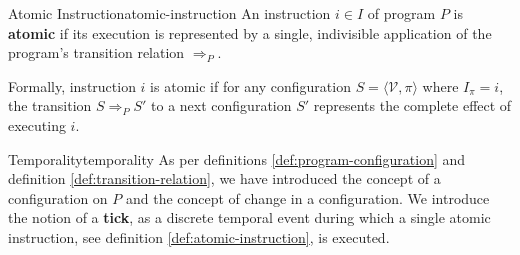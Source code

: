 \begin{definition}{Atomic Instruction}{atomic-instruction}
	An instruction $i \in I$ of program $P$ is \textbf{atomic} if its execution is represented by a single, indivisible application of the program's transition relation $\Rightarrow_P$.
	
	Formally, instruction $i$ is atomic if for any configuration $S = \langle \mathcal{V}, \pi \rangle$ where $I_\pi = i$, the transition $S \Rightarrow_P S'$ to a next configuration $S'$ represents the complete effect of executing $i$.
\end{definition}

\begin{definition}{Temporality}{temporality}
	As per definitions \ref{def:program-configuration} and definition \ref{def:transition-relation}, we have 
	introduced the concept of a configuration on $P$ and the concept of change
	in a configuration. We introduce the notion of a \textbf{tick}, as a discrete
	temporal event during which a single atomic instruction, see definition \ref{def:atomic-instruction}, is executed.
\end{definition}

\newpage